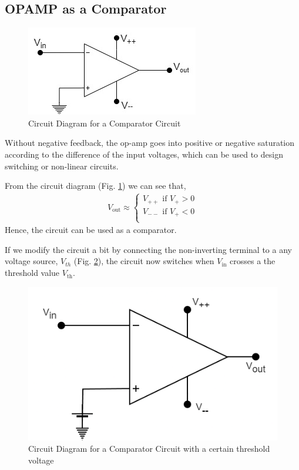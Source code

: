 \subsection{OPAMP as a Comparator}

\begin{figure}[H]
    \centering
    \includegraphics[width=0.8\columnwidth]{images/comparator.jpg}
    \caption{Circuit Diagram for a Comparator Circuit}
    \label{comp1}
\end{figure}

Without negative feedback, the op-amp goes into positive or negative saturation according to the difference of the input voltages, which can be used to design switching or non-linear circuits.

From the circuit diagram (Fig. \ref{comp1}) we can see that, 
\begin{align}
    V_\text{out} \approx \begin{cases}
        V_{++} \text{ if } V_+ > 0\\
        V_{--} \text{ if } V_+ < 0\\
    \end{cases}
\end{align}
Hence, the circuit can be used as a comparator.

If we modify the circuit a bit by connecting the non-inverting terminal to a any voltage source, $V_{th}$ (Fig. \ref{comp2}), the circuit now switches when $V_\text{in}$ crosses a the threshold value $V_\text{th}$.

\begin{figure}[H]
    \centering
    \includegraphics[width=0.8\columnwidth]{images/comp2.png}
    \caption{Circuit Diagram for a Comparator Circuit with a certain threshold voltage}
    \label{comp2}
\end{figure}

